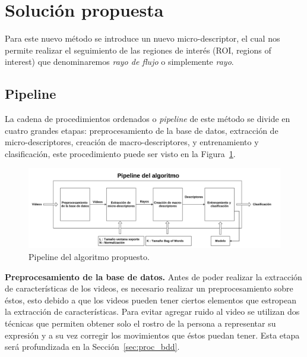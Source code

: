 


\section{Solución propuesta}
\label{sec:solucion}

Para este nuevo método se introduce un nuevo micro-descriptor, el cual nos permite realizar el seguimiento de las regiones de interés (ROI, regions of interest) que denominaremos \textit{rayo de flujo} o simplemente \textit{rayo}.


\subsection{Pipeline}

La cadena de procedimientos ordenados o \textit{pipeline} de este método se divide en cuatro grandes etapas: preprocesamiento de la base de datos, extracción de micro-descriptores, creación de macro-descriptores, y entrenamiento y clasificación, este procedimiento puede ser visto en la Figura~\ref{intro:fig:pipeline}.
	\begin{figure}[b]
		\centering
		\includegraphics[width=1\textwidth]{Figuras/Diagramas/pipeline.png}
		\caption{Pipeline del algoritmo propuesto.}
		\label{intro:fig:pipeline}
	\end{figure}		
	
\textbf{Preprocesamiento de la base de datos.}
Antes de poder realizar la extracción de características de los videos, es necesario realizar un preprocesamiento sobre éstos, esto debido a que los videos pueden tener ciertos elementos que estropean la extracción de características. Para evitar agregar ruido al video se utilizan dos técnicas que permiten obtener solo el rostro de la persona a representar su expresión y a su vez corregir los movimientos que éstos puedan tener. Esta etapa será profundizada en la Sección~\ref{sec:proc_bdd}.


